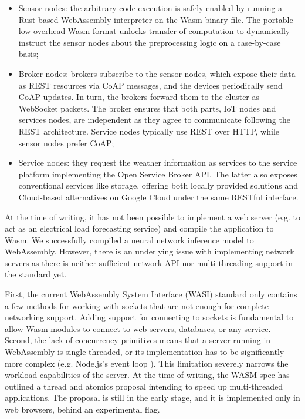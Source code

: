 \begin{itemize}
    \item Sensor nodes: the arbitrary code execution is safely enabled by running a Rust-based WebAssembly interpreter on the Wasm binary file. The portable low-overhead Wasm format unlocks transfer of computation to dynamically instruct the sensor nodes about the preprocessing logic on a case-by-case basis;
    \item Broker nodes: brokers subscribe to the sensor nodes, which expose their data as REST resources via CoAP messages, and the devices periodically send CoAP updates. In turn, the brokers forward them to the cluster as WebSocket packets. The broker ensures that both parts, IoT nodes and services nodes, are independent as they agree to communicate following the REST architecture. Service nodes typically use REST over HTTP, while sensor nodes prefer CoAP;
    \item Service nodes: they request the weather information as services to the service platform implementing the Open Service Broker API. The latter also exposes conventional services like storage, offering both locally provided solutions and Cloud-based alternatives on Google Cloud under the same RESTful interface. 
\end{itemize}

At the time of writing, it has not been possible to implement a web server (e.g. to act as an electrical load forecasting service) and compile the application to Wasm. We successfully compiled a neural network inference model to WebAssembly. However, there is an underlying issue with implementing network servers as there is neither sufficient network API nor multi-threading support in the standard yet.

First, the current WebAssembly System Interface (WASI) standard only contains a few methods for working with sockets that are not enough for complete networking support. Adding support for connecting to sockets is fundamental to allow Wasm modules to connect to web servers, databases, or any service. \\
Second, the lack of concurrency primitives means that a server running in WebAssembly is single-threaded, or its implementation has to be significantly more complex (e.g. Node.js's event loop \cite{nodejs-event-loop}). This limitation severely narrows the workload capabilities of the server. At the time of writing, the WASM spec has outlined a thread and atomics proposal intending to speed up multi-threaded applications. The proposal is still in the early stage, and it is implemented only in web browsers, behind an experimental flag.

